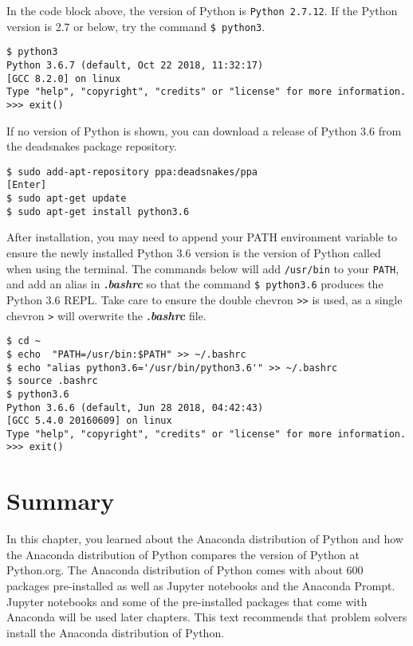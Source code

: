 \documentclass{book}
\newcommand{\passthrough}[1]{#1}
\begin{document}
In the code block above, the version of Python is
\passthrough{\lstinline!Python 2.7.12!}. If the Python version is 2.7 or
below, try the command \passthrough{\lstinline!$ python3!}.

\begin{lstlisting}
$ python3
Python 3.6.7 (default, Oct 22 2018, 11:32:17) 
[GCC 8.2.0] on linux
Type "help", "copyright", "credits" or "license" for more information.
>>> exit()
\end{lstlisting}

If no version of Python is shown, you can download a release of Python
3.6 from the deadsnakes package repository.

\begin{lstlisting}
$ sudo add-apt-repository ppa:deadsnakes/ppa
[Enter]
$ sudo apt-get update
$ sudo apt-get install python3.6
\end{lstlisting}

After installation, you may need to append your PATH environment
variable to ensure the newly installed Python 3.6 version is the version
of Python called when using the terminal. The commands below will add
\passthrough{\lstinline!/usr/bin!} to your
\passthrough{\lstinline!PATH!}, and add an alias in
\textbf{\emph{.bashrc}} so that the command
\passthrough{\lstinline!$ python3.6!} produces the Python 3.6 REPL. Take
care to ensure the double chevron \passthrough{\lstinline!>>!} is used,
as a single chevron \passthrough{\lstinline!>!} will overwrite the
\textbf{\emph{.bashrc}} file.

\begin{lstlisting}
$ cd ~
$ echo  "PATH=/usr/bin:$PATH" >> ~/.bashrc 
$ echo "alias python3.6='/usr/bin/python3.6'" >> ~/.bashrc
$ source .bashrc
$ python3.6
Python 3.6.6 (default, Jun 28 2018, 04:42:43)
[GCC 5.4.0 20160609] on linux
Type "help", "copyright", "credits" or "license" for more information.
>>> exit()
\end{lstlisting}
    




    
        \newpage
        \hypertarget{summary}{%
\section{Summary}\label{summary}}

    




    
        In this chapter, you learned about the Anaconda distribution of Python
and how the Anaconda distribution of Python compares the version of
Python at Python.org. The Anaconda distribution of Python comes with
about 600 packages pre-installed as well as Jupyter notebooks and the
Anaconda Prompt. Jupyter notebooks and some of the pre-installed
packages that come with Anaconda will be used later chapters. This text
recommends that problem solvers install the Anaconda distribution of
Python.
\end{document}
